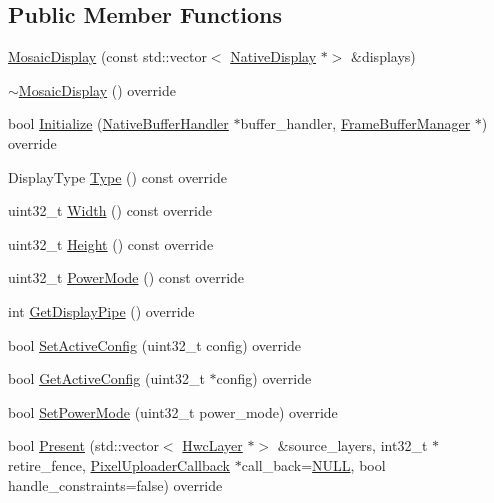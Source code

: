 \subsection*{Public Member Functions}
\begin{DoxyCompactItemize}
\item 
\mbox{\hyperlink{classhwcomposer_1_1MosaicDisplay_a55b36338b1f718942c94d309b3ee7138}{Mosaic\+Display}} (const std\+::vector$<$ \mbox{\hyperlink{classhwcomposer_1_1NativeDisplay}{Native\+Display}} $\ast$$>$ \&displays)
\item 
\mbox{\hyperlink{classhwcomposer_1_1MosaicDisplay_ab5d5f4afacab634238ec516723e6238a}{$\sim$\+Mosaic\+Display}} () override
\item 
bool \mbox{\hyperlink{classhwcomposer_1_1MosaicDisplay_a31b15aba0948d8e1c65f12f2d79f1ecf}{Initialize}} (\mbox{\hyperlink{classhwcomposer_1_1NativeBufferHandler}{Native\+Buffer\+Handler}} $\ast$buffer\+\_\+handler, \mbox{\hyperlink{classhwcomposer_1_1FrameBufferManager}{Frame\+Buffer\+Manager}} $\ast$) override
\item 
Display\+Type \mbox{\hyperlink{classhwcomposer_1_1MosaicDisplay_a7c5288febea28948c2689d7f6feee183}{Type}} () const override
\item 
uint32\+\_\+t \mbox{\hyperlink{classhwcomposer_1_1MosaicDisplay_a5123a951bd40adef34cbe1e11d0a8e69}{Width}} () const override
\item 
uint32\+\_\+t \mbox{\hyperlink{classhwcomposer_1_1MosaicDisplay_af15fda20d779888c521095542b505f9d}{Height}} () const override
\item 
uint32\+\_\+t \mbox{\hyperlink{classhwcomposer_1_1MosaicDisplay_a41e94410e4e73ee057ef672bb51aba65}{Power\+Mode}} () const override
\item 
int \mbox{\hyperlink{classhwcomposer_1_1MosaicDisplay_aab767066611a255bc84d50c4b53b3d5d}{Get\+Display\+Pipe}} () override
\item 
bool \mbox{\hyperlink{classhwcomposer_1_1MosaicDisplay_aaff4528ff2c22a7ec8ce8ab1bc8cbe07}{Set\+Active\+Config}} (uint32\+\_\+t config) override
\item 
bool \mbox{\hyperlink{classhwcomposer_1_1MosaicDisplay_a6283bdb8c3f0ababbb224d71726f4d2c}{Get\+Active\+Config}} (uint32\+\_\+t $\ast$config) override
\item 
bool \mbox{\hyperlink{classhwcomposer_1_1MosaicDisplay_a001b4f2775a2a50d380ff6eb33ba3683}{Set\+Power\+Mode}} (uint32\+\_\+t power\+\_\+mode) override
\item 
bool \mbox{\hyperlink{classhwcomposer_1_1MosaicDisplay_a84e8ddade543bca6659a1eb7bfe72bcd}{Present}} (std\+::vector$<$ \mbox{\hyperlink{structhwcomposer_1_1HwcLayer}{Hwc\+Layer}} $\ast$$>$ \&source\+\_\+layers, int32\+\_\+t $\ast$retire\+\_\+fence, \mbox{\hyperlink{classhwcomposer_1_1PixelUploaderCallback}{Pixel\+Uploader\+Callback}} $\ast$call\+\_\+back=\mbox{\hyperlink{alios_2platformdefines_8h_a070d2ce7b6bb7e5c05602aa8c308d0c4}{N\+U\+LL}}, bool handle\+\_\+constraints=false) override

\end{DoxyCompactItemize}
